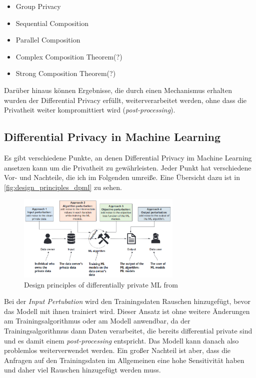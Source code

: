 \begin{itemize}
	\item Group Privacy
	\item Sequential Composition
	\item Parallel Composition
	\item Complex Composition Theorem(?)
	\item Strong Composition Theorem(?)\cite{dwork:2010}
\end{itemize}

Darüber hinaus können Ergebnisse, die durch einen Mechanismus erhalten wurden der Differential Privacy erfüllt, weiterverarbeitet werden, ohne dass die Privatheit weiter kompromittiert wird (\textit{post-processing}).\cite{dwork:2014}

\subsection{Differential Privacy in Machine Learning}
Es gibt verschiedene Punkte, an denen Differential Privacy im Machine Learning ansetzen kann um die Privatheit zu gewährleisten. Jeder Punkt hat verschiedene Vor- und Nachteile, die ich im Folgenden umreiße. Eine Übersicht dazu ist in \autoref{fig:design_principles_dpml} zu sehen.

\begin{figure}[tb]
	\centering
	\includegraphics[width=0.7\textwidth]{Bilder/design_principles_dpml.png}
	\caption{Design principles of differentially private ML from \textcite{chang:2023}}
	\label{fig:design_principles_dpml}
\end{figure}

Bei der \textit{Input Pertubation} wird den Trainingsdaten Rauschen hinzugefügt, bevor das Modell mit ihnen trainiert wird. Dieser Ansatz ist ohne weitere Änderungen am Trainingsalgorithmus oder am Modell anwendbar, da der Trainingsalgorithmus dann Daten verarbeitet, die bereits differential private sind und es damit einem \textit{post-processing} entspricht. Das Modell kann danach also problemlos weiterverwendet werden. Ein großer Nachteil ist aber, dass die Anfragen auf den Trainingsdaten im Allgemeinen eine hohe Sensitivität haben und daher viel Rauschen hinzugefügt werden muss.

